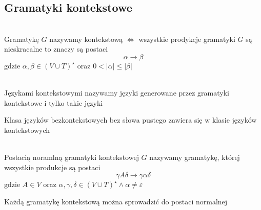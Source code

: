 \subsection{Gramatyki kontekstowe}

	\begin{df}~\\
		Gramatykę $G$ nazywamy kontekstową $\Leftrightarrow$ wszystkie prodykcje gramatyki $G$ są nieskracalne
		to znaczy są postaci 
		\begin{equation}
			\alpha\rightarrow\beta
		\end{equation}
	    gdzie $\alpha,\beta\in (V\cup T)^\star$ oraz $0<|\alpha|\leqslant |\beta|$
	\end{df}			
		
	\begin{df}~\\
		Językami kontekstowymi nazywamy języki generowane przez gramatyki kontekstowe i tylko takie języki
	\end{df}	
	
	\begin{tw}
		Klasa języków bezkontekstowych bez słowa pustego zawiera się w klasie języków kontekstowych
	\end{tw}

	\begin{df}~\\
		Postacią noramlną gramatyki kontekstowej $G$ nazywamy gramatykę, której wszystkie produkcje są postaci
		\begin{equation}
			\gamma A \delta \rightarrow \gamma \alpha \delta
		\end{equation}
		gdzie $A\in V$ oraz $\alpha,\gamma,\delta\in (V\cup T)^\star \wedge \alpha \neq \varepsilon$
	\end{df}
	
	\begin{lemat}
		Każdą gramatykę kontekstową można sprowadzić do postaci normalnej
	\end{lemat}
	
